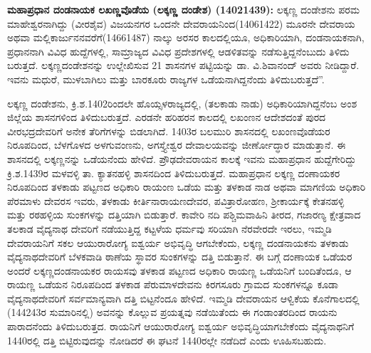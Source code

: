 \textbf{ಮಹಾಪ್ರಧಾನ ದಂಡನಾಯಕ ಲಖಣ್ಣವೊಡೆಯ (ಲಕ್ಕಣ್ಣ ದಂಡೇಶ) (1402\general{\enginline{-}}1439):} ಲಕ್ಕಣ್ಣ ದಂಡೇಶನು ಪರಮ ಮಾಹೇಶ್ವರನಾಗಿದ್ದು (ವೀರಶೈವ) ವಿಜಯನಗರ ಒಂದನೇ ದೇವರಾಯನಿಂದ(1406\enginline{-}1422) ಮೂರನೇ ದೇವರಾಯ ಅಥವಾ ಮಲ್ಲಿಕಾರ್ಜುನನವರೆಗೆ(1466\enginline{-}1487) ನಾಲ್ಕು ಅರಸರ ಕಾಲದಲ್ಲಿಯೂ, ಅಧಿಕಾರಿಯಾಗಿ, ದಂಡನಾಯಕನಾಗಿ, ಪ್ರಧಾನನಾಗಿ ವಿವಿಧ ಹುದ್ದೆಗಳಲ್ಲಿ, ಸಾಮ್ರಾಜ್ಯದ ವಿವಿಧ ಪ್ರದೇಶಗಳಲ್ಲಿ ಆಡಳಿತವನ್ನು ನಡೆಸುತ್ತಿದ್ದನೆಂಬುದು ತಿಳಿದು ಬರುತ್ತದೆ. ಲಕ್ಕಣ್ಣದಂಡೇಶನನ್ನು ಉಲ್ಲೇಖಿಸುವ 21 ಶಾಸನಗಳ ಪಟ್ಟಿಯನ್ನು ಡಾ. ವಿ.ಶಿವಾನಂದ್​ ಅವರು ನೀಡಿದ್ದಾರೆ. ಇವನು ಮಧುರೆ, ಮುಳಬಾಗಿಲು ಮತ್ತು ಬಾರಕೂರು ರಾಜ್ಯಗಳ ಒಡೆಯನಾಗಿದ್ದನೆಂದು ತಿಳಿದುಬರುತ್ತದೆ”.

\newpage

ಲಕ್ಕಣ್ಣ ದಂಡೇಶನು, ಕ್ರಿ.ಶ.1402ರಿಂದಲೇ ಹೊಯ್ಸಳರಾಜ್ಯದಲ್ಲಿ, (ತಲಕಾಡು ನಾಡು) ಅಧಿಕಾರಿಯಾಗಿದ್ದನೆಂಬ ಅಂಶ ಜಿಲ್ಲೆಯ ಶಾಸನಗಳಿಂದ ತಿಳಿದುಬರುತ್ತದೆ. ಎರಡನೇ ಹರಿಹರನ ಕಾಲದಲ್ಲಿ ಲಖಂಣನ ಆದೇಶದಂತೆ ಪುರದ ವೀರಭದ್ರದೇವರಿಗೆ ಅನೇಕ ತೆರಿಗೆಗಳನ್ನು ಬಿಡಲಾಗಿದೆ. 1403ರ ಬಲಮುರಿ ಶಾಸನದಲ್ಲಿ ಲಖಂಣವೊಡೆಯರ ನಿರೂಪದಿಂದ, ಬೆಳಗೊಳದ ಅಳಗುವಂಣನು, ಅಗಸ್ತ್ಯೇಶ್ವರ ದೇವಾಲಯವನ್ನು ಜೀರ್ಣೋದ್ಧಾರ ಮಾಡುತ್ತಾನೆ. ಈ ಶಾಸನದಲ್ಲಿ ಲಕ್ಕಣ್ಣನನ್ನು ಒಡೆಯನೆಂದು ಹೇಳಿದೆ. ಪ್ರೌಢದೇವರಾಯನ ಕಾಲಕ್ಕೆ ಇವನು ಮಹಾಪ್ರಧಾನ ಹುದ್ದೆಗೇರಿದ್ದು ಕ್ರಿ.ಶ.1439ರ ಮಳವಳ್ಳಿ ತಾ. ಕ್ಯಾತನಹಳ್ಳಿ ಶಾಸನದಿಂದ ತಿಳಿದುಬರುತ್ತದೆ. ಮಹಾಪ್ರಧಾನ ಲಕ್ಕಣ್ಣ ದಂಣಾಯಕರ ನಿರೂಪದಿಂದ ತಳಕಾಡು ಪಟ್ಟಣದ ಅಧಿಕಾರಿ ರಾಯಂಣ ಒಡೆಯ ಮತ್ತು ತಳಕಾಡ ನಾಡ ಅಥವಾ ಮಾಗಣಿಯ ಅಧಿಕಾರಿ ಪೆರಮಾಳು ದೇವರಸ ಇವರು, ತಳಕಾಡು ಕೀರ್ತಿನಾರಾಯಣದೇವರ, ಪವಿತ್ರಾರೋಹಣ, ಶ‍್ರೀಕಾರ್ಯಕ್ಕೆ ಕೇತನಹಳ್ಳಿ ಮತ್ತು ರಠಹಳ್ಳಿಯ ಸುಂಕಗಳನ್ನು ದತ್ತಿಯಾಗಿ ಬಿಡುತ್ತಾರೆ. ಕಾವೇರಿ ನದಿ ಪಶ್ಚಿಮವಾಹಿನಿ ತೀರದ, ಗಜಾರಣ್ಯ ಕ್ಷೇತ್ರವಾದ ತಲಕಾಡ ವೈದ್ಯನಾಥ ದೇವರಿಗೆ ನಡೆಯುತ್ತಿದ್ದ ಕಟ್ಟಳೆಯ ಧರ್ಮವು ಸರಿಯಾಗಿ ನೆರವೇರದೇ ಇರಲು, ಇಮ್ಮಡಿ ದೇವರಾಯನಿಗೆ ಸಕಲ ಆಯುರಾರೋಗ್ಯ ಐಶ್ವರ್ಯ ಅಭಿವೃದ್ಧಿ ಆಗಬೇಕೆಂದು, ಲಕ್ಕಣ್ಣ ದಂಡನಾಯಕನು ತಳಕಾಡು ವೈದ್ಯನಾಥದೇವರಿಗೆ ಬೆಳಕವಾಡಿ ಠಾಣೆಯ ಸ್ಥಾವರ ಸುಂಕಗಳನ್ನು ದತ್ತಿ ಬಿಡುತ್ತಾನೆ. ಈ ಬಗ್ಗೆ ದಂಣಾಯಕ ಒಡೆಯರ ಅಂದರೆ ಲಕ್ಕಣ್ಣದಂಡನಾಯಕರ ರಾಯಸವು ತಳಕಾಡ ಪಟ್ಟಣದ ಅಧಿಕಾರಿ ರಾಯಣ್ಣ ಒಡೆಯನಿಗೆ ಬಂದಿತೆಂದೂ, ಆ ರಾಯಣ್ಣ ಒಡೆಯನ ನಿರೂಪದಿಂದ ತಳಕಾಡ ಪೆರುಮಾಳದೇವನು ಕಿರಗಸೂರು ಗ್ರಾಮದ ಸುಂಕಗಳನ್ನೂ ಕೂಡಾ ವೈದ್ಯನಾಥದೇವರಿಗೆ ಸರ್ವಮಾನ್ಯವಾಗಿ ದತ್ತಿ ಬಿಟ್ಟನೆಂದೂ ಹೇಳಿದೆ. ಇಮ್ಮಡಿ ದೇವರಾಯನ ಆಳ್ವಿಕೆಯ ಕೊನೆಗಾಲದಲ್ಲಿ (1442\enginline{-}43ರ ಸುಮಾರಿನಲ್ಲಿ) ಅವನನ್ನು ಕೊಲ್ಲುವ ಪ್ರಯತ್ನವು ನಡೆಯಿತೆಂದು ಈ ಗಂಡಾಂತರದಿಂದ ರಾಯನು ಪಾರಾದನೆಂದು ತಿಳಿದುಬರುತ್ತದ. ರಾಯನಿಗೆ ಆಯುರಾರೋಗ್ಯ ಐಶ್ವರ್ಯ ಅಭಿವೃದ್ಧಿಯಾಗಬೇಕೆಂದು ವೈದ್ಯನಾಥನಿಗೆ 1440ರಲ್ಲಿ ದತ್ತಿ ಬಿಟ್ಟಿರುವುದನ್ನು ನೋಡಿದರೆ ಈ ಘಟನೆ 1440ರಲ್ಲೇ ನಡೆದಿದೆ ಎಂದು ಊಹಿಸಬಹುದು.

